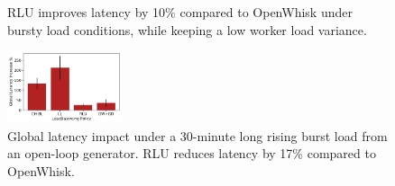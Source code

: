 \begin{figure}
  \centering
  \caption{RLU improves latency by 10\% compared to OpenWhisk under bursty load conditions, while keeping a low worker load variance.}
  \label{fig:bursty-closedload}
\end{figure}




\begin{figure}
  \centering
  \includegraphics[width=0.3\textwidth]{chrlu/faaslb-osdi22/figs/ow/openload/openload-latencies-cntnorm.pdf}
  \caption{Global latency impact under a 30-minute long rising burst load from an open-loop generator. RLU reduces  latency by 17\% compared to OpenWhisk.}
  \label{fig:bursty-openload}
\end{figure}


